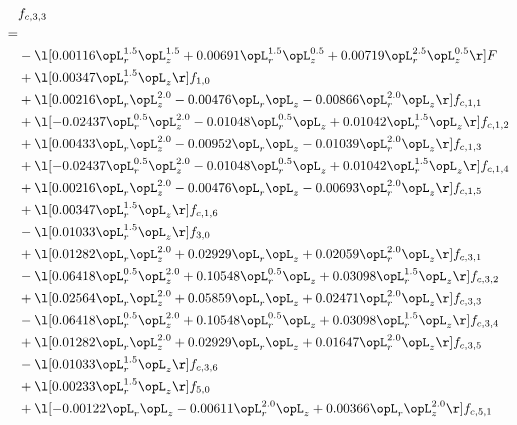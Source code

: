 \begin{alignat}{2} 
\label{eq:f_33_1} 
& f_{c,3,3} \nonumber \\ 
 = \\ 
& - \l[  0.00116 \opL_r^{1.5} \opL_z^{1.5} +  0.00691 \opL_r^{1.5} \opL_z^{0.5} +  0.00719 \opL_r^{2.5} \opL_z^{0.5}  \r] F \nonumber \\ 
& + \l[  0.00347 \opL_r^{1.5} \opL_z  \r] f_{1,0} \nonumber \\ 
& + \l[  0.00216 \opL_r \opL_z^{2.0}   -0.00476 \opL_r \opL_z   -0.00866 \opL_r^{2.0} \opL_z  \r] f_{c,1,1} \nonumber \\ 
& + \l[  -0.02437 \opL_r^{0.5} \opL_z^{2.0}   -0.01048 \opL_r^{0.5} \opL_z +  0.01042 \opL_r^{1.5} \opL_z  \r] f_{c,1,2} \nonumber \\ 
& + \l[  0.00433 \opL_r \opL_z^{2.0}   -0.00952 \opL_r \opL_z   -0.01039 \opL_r^{2.0} \opL_z  \r] f_{c,1,3} \nonumber \\ 
& + \l[  -0.02437 \opL_r^{0.5} \opL_z^{2.0}   -0.01048 \opL_r^{0.5} \opL_z +  0.01042 \opL_r^{1.5} \opL_z  \r] f_{c,1,4} \nonumber \\ 
& + \l[  0.00216 \opL_r \opL_z^{2.0}   -0.00476 \opL_r \opL_z   -0.00693 \opL_r^{2.0} \opL_z  \r] f_{c,1,5} \nonumber \\ 
& + \l[  0.00347 \opL_r^{1.5} \opL_z  \r] f_{c,1,6} \nonumber \\ 
& - \l[  0.01033 \opL_r^{1.5} \opL_z  \r] f_{3,0} \nonumber \\ 
& + \l[  0.01282 \opL_r \opL_z^{2.0} +  0.02929 \opL_r \opL_z +  0.02059 \opL_r^{2.0} \opL_z  \r] f_{c,3,1} \nonumber \\ 
& - \l[  0.06418 \opL_r^{0.5} \opL_z^{2.0} +  0.10548 \opL_r^{0.5} \opL_z +  0.03098 \opL_r^{1.5} \opL_z  \r] f_{c,3,2} \nonumber \\ 
& + \l[  0.02564 \opL_r \opL_z^{2.0} +  0.05859 \opL_r \opL_z +  0.02471 \opL_r^{2.0} \opL_z  \r] f_{c,3,3} \nonumber \\ 
& - \l[  0.06418 \opL_r^{0.5} \opL_z^{2.0} +  0.10548 \opL_r^{0.5} \opL_z +  0.03098 \opL_r^{1.5} \opL_z  \r] f_{c,3,4} \nonumber \\ 
& + \l[  0.01282 \opL_r \opL_z^{2.0} +  0.02929 \opL_r \opL_z +  0.01647 \opL_r^{2.0} \opL_z  \r] f_{c,3,5} \nonumber \\ 
& - \l[  0.01033 \opL_r^{1.5} \opL_z  \r] f_{c,3,6} \nonumber \\ 
& + \l[  0.00233 \opL_r^{1.5} \opL_z  \r] f_{5,0} \nonumber \\ 
& + \l[  -0.00122 \opL_r \opL_z   -0.00611 \opL_r^{2.0} \opL_z +  0.00366 \opL_r \opL_z^{2.0}  \r] f_{c,5,1} \nonumber \\ 

\end{alignat}
